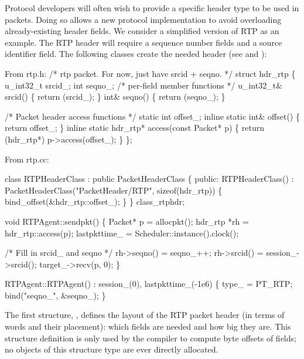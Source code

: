 Protocol developers
will often wish to provide a specific header type to be used in packets.
Doing so allows a new protocol implementation
to avoid overloading already-existing header fields.
We consider a simplified version of RTP as an example.
The RTP header will require a sequence number fields and a source
identifier field.
The following classes create the needed header
(see  and ):
\begin{program}
{\rm From rtp.h:}
        /* {\cf rtp packet.  For now, just have srcid + seqno.} */
        struct hdr_rtp \{ 
                u_int32_t srcid_;
                int seqno_;
                /* {\cf per-field member functions } */
                u_int32_t& srcid() \{ return (srcid_); \}
                int& seqno() \{ return (seqno_); \}

                /* {\cf Packet header access functions} */
                static int offset_;
                inline static int& offset() \{ return offset_; \}
                inline static hdr_rtp* access(const Packet* p) \{
                        return (hdr_rtp*) p->access(offset_);
                \}
        \};

{\rm From rtp.cc:}

        class RTPHeaderClass : public PacketHeaderClass \{
        public: 
                RTPHeaderClass() : PacketHeaderClass("PacketHeader/RTP",
                                                     sizeof(hdr_rtp)) \{
                        bind_offset(&hdr_rtp::offset_);
                \}
        \} class_rtphdr;

        void RTPAgent::sendpkt()
        \{
                Packet* p = allocpkt();
                hdr_rtp *rh = hdr_rtp::access(p);
                lastpkttime_ = Scheduler::instance().clock();

                /* {\cf Fill in srcid_ and seqno} */
                rh->seqno() = seqno_++;
                rh->srcid() = session_->srcid();
                target_->recv(p, 0);
        \}

        RTPAgent::RTPAgent()
                : session_(0), lastpkttime_(-1e6)
        \{
                type_ = PT_RTP;
                bind("seqno_", &seqno_);
        \}
\end{program}
The first structure, , defines the layout
of the RTP packet header (in terms of words and their placement):
which fields are needed and how big they are.
This structure definition is only used by the
compiler to compute byte offsets of fields;
no objects of this structure type are ever directly allocated.
